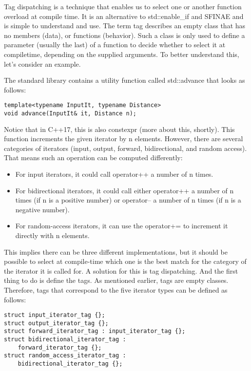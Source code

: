 
Tag dispatching is a technique that enables us to select one or another function overload at compile time. It is an alternative to std::enable\_if and SFINAE and is simple to understand and use. The term tag describes an empty class that has no members (data), or functions (behavior). Such a class is only used to define a parameter (usually the last) of a function to decide whether to select it at compiletime, depending on the supplied arguments. To better understand this, let’s consider an example.

The standard library contains a utility function called std::advance that looks as follows:

\begin{lstlisting}[style=styleCXX]
template<typename InputIt, typename Distance>
void advance(InputIt& it, Distance n);
\end{lstlisting}

Notice that in C++17, this is also constexpr (more about this, shortly). This function increments the given iterator by n elements. However, there are several categories of iterators (input, output, forward, bidirectional, and random access). That means such an operation can be computed differently:

\begin{itemize}
\item
For input iterators, it could call operator++ a number of n times.

\item
For bidirectional iterators, it could call either operator++ a number of n times (if n is a positive number) or operator-- a number of n times (if n is a negative number).

\item
For random-access iterators, it can use the operator+= to increment it directly with n elements.
\end{itemize}

This implies there can be three different implementations, but it should be possible to select at compile-time which one is the best match for the category of the iterator it is called for. A solution for this is tag dispatching. And the first thing to do is define the tags. As mentioned earlier, tags are empty classes. Therefore, tags that correspond to the five iterator types can be defined as follows:

\begin{lstlisting}[style=styleCXX]
struct input_iterator_tag {};
struct output_iterator_tag {};
struct forward_iterator_tag : input_iterator_tag {};
struct bidirectional_iterator_tag :
	forward_iterator_tag {};
struct random_access_iterator_tag :
	bidirectional_iterator_tag {};
\end{lstlisting}

